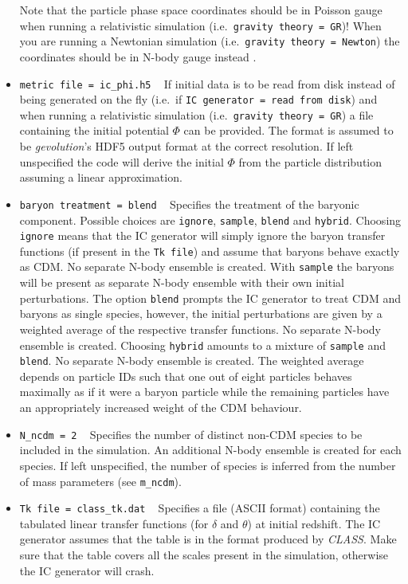 \documentclass[a4paper,10pt]{article}
\begin{document}
\begin{itemize}
 Note that the particle phase space coordinates should be in Poisson gauge when running a relativistic simulation
 (i.e.\ \texttt{gravity theory = GR})! When you are running a Newtonian simulation (i.e.\ \texttt{gravity theory = Newton}) the
 coordinates should be in N-body gauge instead \cite{Fidler:2015npa}.
 \item[] \hspace{-25pt}\texttt{metric file = ic\_phi.h5} ~ If initial data is to be read from disk instead of being generated on the fly
 (i.e.\ if \texttt{IC~generator~=~read~from~disk}) and when running a relativistic simulation (i.e.\ \texttt{gravity theory = GR}) a file
 containing the initial potential $\mathsf{\Phi}$ can be provided. The format is assumed to be \textit{gevolution}'s HDF5 output format
 at the correct resolution. If left unspecified the code will derive the initial $\mathsf{\Phi}$ from the particle distribution assuming
 a linear approximation.
 \item[] \hspace{-25pt}\texttt{baryon treatment = blend} ~ Specifies the treatment of the baryonic component. Possible choices are
 \texttt{ignore}, \texttt{sample}, \texttt{blend} and \texttt{hybrid}. Choosing \texttt{ignore} means that the IC generator will simply
 ignore the baryon transfer functions (if present in the \texttt{Tk file}) and assume that baryons behave exactly as CDM. No separate N-body
 ensemble is created. With \texttt{sample} the baryons will be present as separate N-body ensemble with their own initial perturbations.
 The option \texttt{blend} prompts the IC generator to treat CDM and baryons as single species, however, the initial perturbations are given
 by a weighted average of the respective transfer functions. No separate N-body ensemble is created. Choosing \texttt{hybrid} amounts to a
 mixture of \texttt{sample} and \texttt{blend}. No separate N-body ensemble is created. The weighted average depends on particle IDs such
 that one out of eight particles behaves maximally as if it were a baryon particle while the remaining particles have an appropriately
 increased weight of the CDM behaviour.
 \item[] \hspace{-25pt}\texttt{N\_ncdm = 2} ~ Specifies the number of distinct non-CDM species to be included in the simulation. An
 additional N-body ensemble is created for each species. If left unspecified, the number of species is inferred from the number of mass
 parameters (see \texttt{m\_ncdm}).
 \item[] \hspace{-25pt}\texttt{Tk file = class\_tk.dat} ~ Specifies a file (ASCII format) containing the tabulated linear transfer functions
 (for $\mathsf{\delta}$ and $\mathsf{\theta}$) at initial redshift. The IC generator assumes that the table is in the format produced by
 \textit{CLASS}. Make sure that the table covers all the scales present in the simulation, otherwise the IC generator will crash.
 

\end{itemize}
\end{document}

